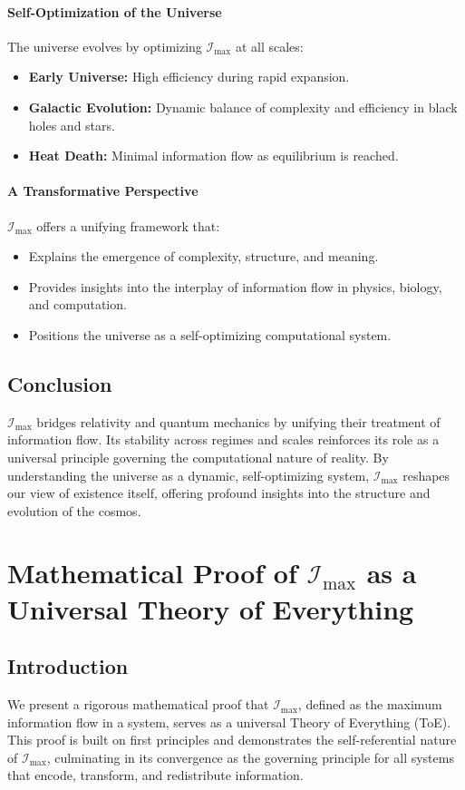 \documentclass[12pt]{article}
\begin{document}
\paragraph{Self-Optimization of the Universe}
The universe evolves by optimizing \(\mathcal{I}_{\text{max}}\) at all scales:
\begin{itemize}
    \item \textbf{Early Universe:} High efficiency during rapid expansion.
    \item \textbf{Galactic Evolution:} Dynamic balance of complexity and efficiency in black holes and stars.
    \item \textbf{Heat Death:} Minimal information flow as equilibrium is reached.
\end{itemize}

\paragraph{A Transformative Perspective}
\(\mathcal{I}_{\text{max}}\) offers a unifying framework that:
\begin{itemize}
    \item Explains the emergence of complexity, structure, and meaning.
    \item Provides insights into the interplay of information flow in physics, biology, and computation.
    \item Positions the universe as a self-optimizing computational system.
\end{itemize}

\subsection{Conclusion}
\(\mathcal{I}_{\text{max}}\) bridges relativity and quantum mechanics by unifying their treatment of information flow. Its stability across regimes and scales reinforces its role as a universal principle governing the computational nature of reality. By understanding the universe as a dynamic, self-optimizing system, \(\mathcal{I}_{\text{max}}\) reshapes our view of existence itself, offering profound insights into the structure and evolution of the cosmos.


\section{Mathematical Proof of \(\mathcal{I}_{\text{max}}\) as a Universal Theory of Everything}

\subsection{Introduction}
We present a rigorous mathematical proof that \(\mathcal{I}_{\text{max}}\), defined as the maximum information flow in a system, serves as a universal Theory of Everything (ToE). This proof is built on first principles and demonstrates the self-referential nature of \(\mathcal{I}_{\text{max}}\), culminating in its convergence as the governing principle for all systems that encode, transform, and redistribute information.
\end{document}
